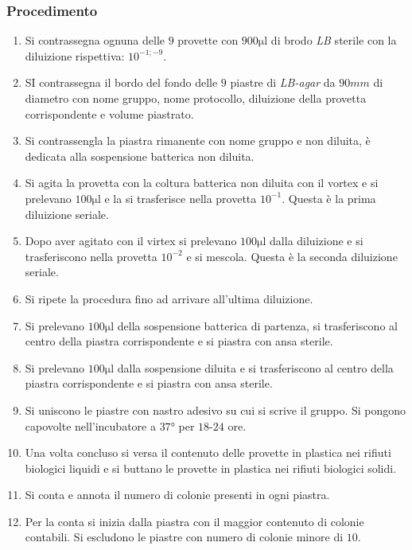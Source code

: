 		\subsubsection{Procedimento}
		\begin{enumerate}
			\item Si contrassegna ognuna delle $9$ provette con $900\si{\micro\litre}$ di brodo \emph{LB} sterile con la diluizione rispettiva: $10^{-1;-9}$.
			\item SI contrassegna il bordo del fondo delle $9$ piastre di \emph{LB-agar} da $90\si{mm}$ di diametro con nome gruppo, nome protocollo, diluizione della provetta corrispondente e volume piastrato.
			\item Si contrassengla la piastra rimanente con nome gruppo e non diluita, \`e dedicata alla sospensione batterica non diluita.
			\item Si agita la provetta con la coltura batterica non diluita con il vortex e si prelevano $100\si{\micro\litre}$ e la si trasferisce nella provetta $10^{-1}$.
				Questa \`e la prima diluizione seriale.
			\item Dopo aver agitato con il virtex si prelevano $100\si{\micro\litre}$ dalla diluizione e si trasferiscono nella provetta $10^{-2}$ e si mescola.
				Questa \`e la seconda diluizione seriale.
			\item Si ripete la procedura fino ad arrivare all'ultima diluizione.
			\item Si prelevano $100\si{\micro\litre}$ della sospensione batterica di partenza, si trasferiscono al centro della piastra corrispondente e si piastra con ansa sterile.
			\item Si prelevano $100\si{\micro\litre}$ dalla sospensione diluita e si trasferiscono al centro della piastra corrispondente e si piastra con ansa sterile.
			\item Si uniscono le piastre con nastro adesivo su cui si scrive il gruppo. 
				Si pongono capovolte nell'incubatore a $37\si{\degree}$ per $18$-$24$ ore.
			\item Una volta concluso si versa il contenuto delle provette in plastica nei rifiuti biologici liquidi e si buttano le provette in plastica nei rifiuti biologici solidi.
			\item Si conta e annota il numero di colonie presenti in ogni piastra.
			\item Per la conta si inizia dalla piastra con il maggior contenuto di colonie contabili.
				Si escludono le piastre con numero di colonie minore di $10$.
		\end{enumerate}

